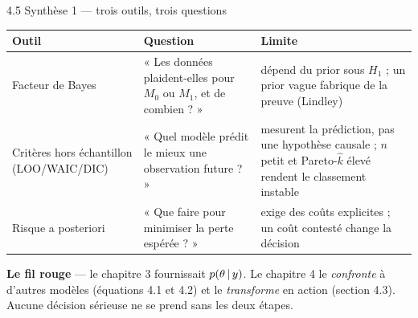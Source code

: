 \begin{frame}{4.5 Synthèse 1 --- trois outils, trois questions}
\begin{kbox}
\begin{center}
\small
\begin{tabular}{@{}p{3.1cm}p{4.5cm}p{5.4cm}@{}}
\toprule
\textbf{Outil} & \textbf{Question} & \textbf{Limite} \\
\midrule
Facteur de Bayes & « Les données plaident-elles pour $M_0$ ou $M_1$, et de combien ? » & dépend du prior sous $H_1$ ; un prior vague fabrique de la preuve (Lindley) \\[1.4mm]
Critères hors échantillon (LOO/WAIC/DIC) & « Quel modèle prédit le mieux une observation future ? » & mesurent la prédiction, pas une hypothèse causale ; $n$ petit et Pareto-$\hat k$ élevé rendent le classement instable \\[1.4mm]
Risque a posteriori & « Que faire pour minimiser la perte espérée ? » & exige des coûts explicites ; un coût contesté change la décision \\
\bottomrule
\end{tabular}
\end{center}
\end{kbox}
\vspace{1mm}
\begin{tcolorbox}[colback=byCyan!8,colframe=byCyan,arc=2mm,width=.95\textwidth]
\small\centering
\textbf{Le fil rouge} --- le chapitre 3 fournissait $p(\theta \,\vert\, y)$.
Le chapitre 4 le \emph{confronte} à d'autres modèles (équations 4.1 et 4.2)
et le \emph{transforme} en action (section 4.3). Aucune décision sérieuse
ne se prend sans les deux étapes.
\end{tcolorbox}
\end{frame}

